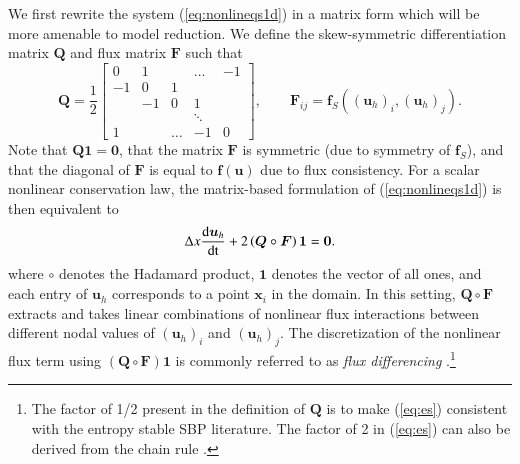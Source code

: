 \documentclass[preprint,10pt]{elsarticle}
\theoremstyle{definition}
\theoremstyle{lemma}
\theoremstyle{theorem}
\theoremstyle{assumption}
\newcommand{\td}[2]{\frac{{\rm d}#1}{{\rm d}{\rm #2}}}
\newcommand{\LRp}[1]{\left( #1 \right)}
\begin{document}
We first rewrite the system (\ref{eq:nonlineqs1d}) in a matrix form which will be more amenable to model reduction.  We define the skew-symmetric differentiation matrix $\bm{Q}$ and flux matrix $\bm{F}$ such that
\begin{equation}
\bm{Q} = \frac{1}{2}\begin{bmatrix}
0 & 1 & &\ldots & -1\\
-1 & 0 & 1 &&  \\
& -1 & 0 & 1 &  \\
 & & & \ddots &  \\
1 & &\ldots  & -1 & 0
\end{bmatrix}, \qquad \bm{F}_{ij} = \bm{f}_{S}\LRp{\LRp{\bm{u}_h}_i, \LRp{\bm{u}_h}_j}.
\label{eq:Qmat}
\end{equation}
Note that $\bm{Q}\bm{1} = \bm{0}$, that the matrix $\bm{F}$ is symmetric (due to symmetry of $\bm{f}_S$), and that the diagonal of $\bm{F}$ is equal to $\bm{f}(\bm{u})$ due to flux consistency.  For a scalar nonlinear conservation law, the matrix-based formulation of (\ref{eq:nonlineqs1d}) is then equivalent to
\begin{align}
\Delta x \td{\bm{u}_h}{t} + 2\LRp{{\bm{Q}}\circ \bm{F}}\bm{1} = \bm{0}.
\label{eq:es}
\end{align}
where $\circ$ denotes the Hadamard product, $\bm{1}$ denotes the vector of all ones, and each entry of $\bm{u}_h$ corresponds to a point $\bm{x}_i$ in the domain.  In this setting, $\bm{Q}\circ\bm{F}$ extracts and takes linear combinations of nonlinear flux interactions between different nodal values of $(\bm{u}_h)_i$ and $(\bm{u}_h)_j$.  The discretization of the nonlinear flux term using $\LRp{\bm{Q}\circ \bm{F}}\bm{1}$ is commonly referred to as \textit{flux differencing} \cite{carpenter2014entropy, gassner2016split, chen2017entropy, crean2018entropy, chan2017discretely}.\footnote{The factor of 1/2 present in the definition of $\bm{Q}$ is to make (\ref{eq:es}) consistent with the entropy stable SBP literature.  The factor of 2 in (\ref{eq:es}) can also be derived from the chain rule \cite{chen2017entropy, crean2018entropy}.  }
\end{document}
